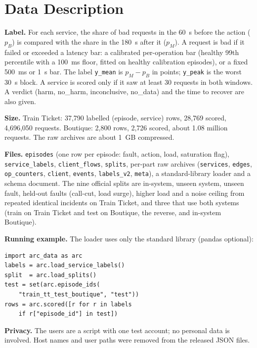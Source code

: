 \documentclass[10pt,conference]{IEEEtran}
\begin{document}
\section{Data Description}
\textbf{Label.} For each service, the share of bad requests in the 60~s before the action ($p_B$) is compared with the share in the 180~s after it ($p_M$). A request is bad if it failed or exceeded a latency bar: a calibrated per-operation bar (healthy 99th percentile with a 100~ms floor, fitted on healthy calibration episodes), or a fixed 500~ms or 1~s bar. The label \texttt{y\_mean} is $p_M - p_B$ in points; \texttt{y\_peak} is the worst 30~s block. A service is scored only if it saw at least 30 requests in both windows. A verdict (harm, no\_harm, inconclusive, no\_data) and the time to recover are also given.

\textbf{Size.} Train Ticket: 37{,}790 labelled (episode, service) rows, 28{,}769 scored, 4{,}696{,}050 requests. Boutique: 2{,}800 rows, 2{,}726 scored, about 1.08 million requests. The raw archives are about 1~GB compressed.

\textbf{Files.} \texttt{episodes} (one row per episode: fault, action, load, saturation flag), \texttt{service\_labels}, \texttt{client\_flows}, \texttt{splits}, per-part raw archives (\texttt{services}, \texttt{edges}, \texttt{op\_counters}, \texttt{client}, \texttt{events}, \texttt{labels\_v2}, \texttt{meta}), a standard-library loader and a schema document. The nine official splits are in-system, unseen system, unseen fault, held-out faults (call-cut, load surge), higher load and a noise ceiling from repeated identical incidents on Train Ticket, and three that use both systems (train on Train Ticket and test on Boutique, the reverse, and in-system Boutique).

\textbf{Running example.} The loader uses only the standard library (pandas optional):
\begin{footnotesize}
\begin{verbatim}
import arc_data as arc
labels = arc.load_service_labels()
split  = arc.load_splits()
test = set(arc.episode_ids(
    "train_tt_test_boutique", "test"))
rows = arc.scored([r for r in labels
    if r["episode_id"] in test])
\end{verbatim}
\end{footnotesize}

\textbf{Privacy.} The users are a script with one test account; no personal data is involved. Host names and user paths were removed from the released JSON files.
\end{document}

